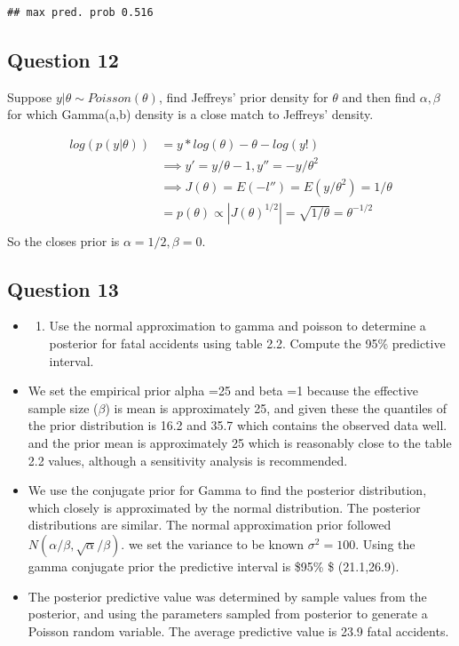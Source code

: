 \documentclass[
]{book}
\providecommand{\tightlist}{%
  \setlength{\itemsep}{0pt}\setlength{\parskip}{0pt}}
\theoremstyle{definition}
\theoremstyle{definition}
\theoremstyle{definition}
\theoremstyle{definition}
\theoremstyle{remark}
\begin{document}
\begin{verbatim}
## max pred. prob 0.516
\end{verbatim}

\hypertarget{question-12}{%
\subsection*{Question 12}\label{question-12}}

Suppose \(y|\theta \sim Poisson(\theta)\), find Jeffreys' prior density for \(\theta\) and then find \(\alpha,\beta\) for which Gamma(a,b) density is a close match to Jeffreys' density.

\[
\begin{aligned}
 log(p(y|\theta))&= y*log(\theta)-\theta -log(y!)\\
 &\implies y' = y/\theta - 1 ,  y'' = -y/\theta^2 \\
 &\implies J(\theta)= E(- l'')= E(y/\theta^2)= 1/\theta \\
 &= p(\theta)\propto |J(\theta)^{1/2}| = \sqrt{1/\theta} = \theta^{-1/2}\\
\end{aligned}
\]
So the closes prior is \(\alpha=1/2 , \beta=0\).

\hypertarget{question-13}{%
\subsection*{Question 13}\label{question-13}}

\begin{itemize}
\item
  \begin{enumerate}
  \def\labelenumi{(\alph{enumi})}
  \tightlist
  \item
    Use the normal approximation to gamma and poisson to determine a posterior for fatal accidents using table 2.2. Compute the 95\(\%\) predictive interval.
  \end{enumerate}
\item
  We set the empirical prior alpha =25 and beta =1 because the effective sample size (\(\beta\)) is mean is approximately 25, and given these the quantiles of the prior distribution is 16.2 and 35.7 which contains the observed data well. and the prior mean is approximately 25 which is reasonably close to the table 2.2 values, although a sensitivity analysis is recommended.
\item
  We use the conjugate prior for Gamma to find the posterior distribution, which closely is approximated by the normal distribution. The posterior distributions are similar. The normal approximation prior followed \(N(\alpha/\beta, \sqrt{\alpha}/\beta)\). we set the variance to be known \(\sigma^2=100\). Using the gamma conjugate prior the predictive interval is \$95\% \$ (21.1,26.9).
\item
  The posterior predictive value was determined by sample values from the posterior, and using the parameters sampled from posterior to generate a Poisson random variable. The average predictive value is 23.9 fatal accidents.
\end{itemize}
\end{document}
